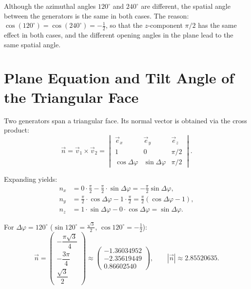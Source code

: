 \begin{bemerkung}
Although the azimuthal angles $120^\circ$ and $240^\circ$ are different, the
spatial angle between the generators is the same in both cases.
The reason: $\cos(120^\circ) = \cos(240^\circ) = -\tfrac{1}{2}$, so that
the $z$-component $\pi/2$ has the same effect in both cases,
and the different opening angles in the plane lead to the same
spatial angle.
\end{bemerkung}

\section{Plane Equation and Tilt Angle of the Triangular Face}

Two generators span a triangular face. Its
normal vector is obtained via the cross product:
\[
  \vec{n}
  = \vec{v}_1 \times \vec{v}_2
  = \begin{vmatrix}\vec{e}_x & \vec{e}_y & \vec{e}_z\\
      1 & 0 & \pi/2\\
      \cos\Delta\varphi & \sin\Delta\varphi & \pi/2
    \end{vmatrix}.
\]

Expanding yields:
\begin{align*}
  n_x &= 0\cdot\tfrac{\pi}{2} - \tfrac{\pi}{2}\cdot\sin\Delta\varphi
       = -\frac{\pi}{2}\sin\Delta\varphi, \\
  n_y &= \tfrac{\pi}{2}\cdot\cos\Delta\varphi - 1\cdot\tfrac{\pi}{2}
       = \frac{\pi}{2}(\cos\Delta\varphi - 1), \\
  n_z &= 1\cdot\sin\Delta\varphi - 0\cdot\cos\Delta\varphi
       = \sin\Delta\varphi.
\end{align*}

For $\Delta\varphi = 120^\circ$ ($\sin 120^\circ = \tfrac{\sqrt{3}}{2}$,
$\cos 120^\circ = -\tfrac{1}{2}$):
\[
  \vec{n}
  = \begin{pmatrix}
      -\dfrac{\pi\sqrt{3}}{4}\\[6pt]
      -\dfrac{3\pi}{4}\\[6pt]
      \dfrac{\sqrt{3}}{2}
    \end{pmatrix}
  \approx
  \begin{pmatrix}-1.36034952\\-2.35619449\\0.86602540\end{pmatrix},
  \qquad
  |\vec{n}| \approx 2.85520635.
\]

